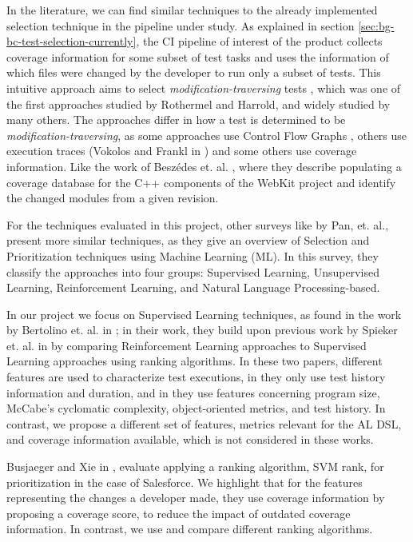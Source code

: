 In the literature, we can find similar techniques to the already implemented selection technique
in the pipeline under study. As explained in section \ref{sec:bg-bc-test-selection-currently},
the CI pipeline of interest of the product collects coverage information for some subset of test tasks and
uses the information of which files were changed by the developer to run only a subset of tests. This intuitive 
approach aims to select \emph{modification-traversing} tests \cite{536955}, 
which was one of the first approaches studied by Rothermel and Harrold, and widely studied by many others.
The approaches differ in how a test is determined to be \emph{modification-traversing}, 
as some approaches use Control Flow Graphs \cite{366926}, others use execution traces (Vokolos and Frankl in \cite{Vokolos1997PythiaAR})
and some others use coverage information. Like the work of Beszédes et. al. \cite{Beszdes2012CodeCR}, where they
describe populating a coverage database for the C++ components of the WebKit project
and identify the changed modules from a given revision.

For the techniques evaluated in this project, other surveys like \cite{Pan2021TestCS} by Pan, et. al.,
present more similar techniques, as they give an overview of Selection and Prioritization techniques
using Machine Learning (ML). In this survey, they classify the approaches into four groups: Supervised
Learning, Unsupervised Learning, Reinforcement Learning, and Natural Language Processing-based.

In our project we focus on Supervised Learning techniques, as found in the work by Bertolino et. al. in 
\cite{Bertolino2020LearningtoRankVR}; in their work, they build upon previous work by Spieker et. al. in \cite{DBLP:journals/corr/abs-1811-04122}
by comparing Reinforcement Learning approaches to Supervised Learning approaches using ranking algorithms.
In these two papers, different features are used to characterize test executions, in \cite{DBLP:journals/corr/abs-1811-04122} 
they only use test history information and duration, and in \cite{Bertolino2020LearningtoRankVR} they use 
features concerning program size, McCabe's cyclomatic complexity, object-oriented metrics, and test history.
In contrast, we propose a different set of features, metrics relevant for the AL DSL, and coverage information
available, which is not considered in these works.

Busjaeger and Xie in \cite{Busjaeger2016LearningFT}, evaluate applying a ranking algorithm, SVM rank, for prioritization 
in the case of Salesforce. We highlight that for the features representing
the changes a developer made, they use coverage information by proposing a coverage score, to 
reduce the impact of outdated coverage information. In contrast, we use and compare different ranking algorithms.

